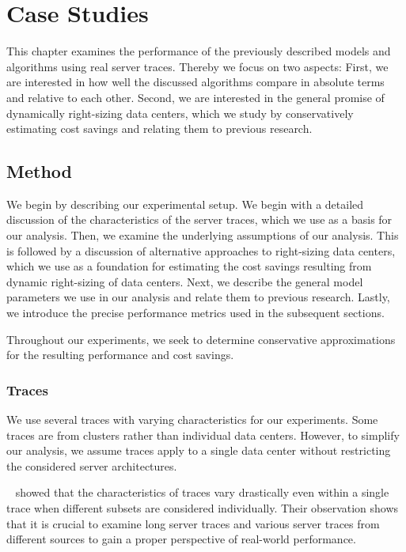 
\chapter{Case Studies}\label{chapter:case_studies}

This chapter examines the performance of the previously described models and algorithms using real server traces. Thereby we focus on two aspects: First, we are interested in how well the discussed algorithms compare in absolute terms and relative to each other. Second, we are interested in the general promise of dynamically right-sizing data centers, which we study by conservatively estimating cost savings and relating them to previous research.

\section{Method}

We begin by describing our experimental setup. We begin with a detailed discussion of the characteristics of the server traces, which we use as a basis for our analysis. Then, we examine the underlying assumptions of our analysis. This is followed by a discussion of alternative approaches to right-sizing data centers, which we use as a foundation for estimating the cost savings resulting from dynamic right-sizing of data centers. Next, we describe the general model parameters we use in our analysis and relate them to previous research. Lastly, we introduce the precise performance metrics used in the subsequent sections.

Throughout our experiments, we seek to determine conservative approximations for the resulting performance and cost savings.

\subsection{Traces}\label{section:case_studies:method:traces}

We use several traces with varying characteristics for our experiments. Some traces are from clusters rather than individual data centers. However, to simplify our analysis, we assume traces apply to a single data center without restricting the considered server architectures.

\citeauthor*{Amvrosiadis2018}~\cite{Amvrosiadis2018} showed that the characteristics of traces vary drastically even within a single trace when different subsets are considered individually. Their observation shows that it is crucial to examine long server traces and various server traces from different sources to gain a proper perspective of real-world performance.

